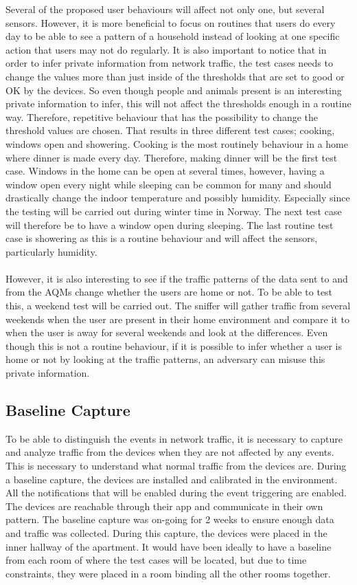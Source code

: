 Several of the proposed user behaviours will affect not only one, but several sensors. However, it is more beneficial to focus on routines that users do every day to be able to see a pattern of a household instead of looking at one specific action that users may not do regularly. It is also important to notice that in order to infer private information from network traffic, the test cases needs to change the values more than just inside of the thresholds that are set to good or OK by the devices. So even though people and animals present is an interesting private information to infer, this will not affect the thresholds enough in a routine way. Therefore, repetitive behaviour that has the possibility to change the threshold values are chosen. That results in three different test cases; cooking, windows open and showering. Cooking is the most routinely behaviour in a home where dinner is made every day. Therefore, making dinner will be the first test case. Windows in the home can be open at several times, however, having a window open every night while sleeping can be common for many and should drastically change the indoor temperature and possibly humidity. Especially since the testing will be carried out during winter time in Norway. The next test case will therefore be to have a window open during sleeping. The last routine test case is showering as this is a routine behaviour and will affect the sensors, particularly humidity. 
\\\\
However, it is also interesting to see if the traffic patterns of the data sent to and from the AQMs change whether the users are home or not. To be able to test this, a weekend test will be carried out. The sniffer will gather traffic from several weekends when the user are present in their home environment and compare it to when the user is away for several weekends and look at the differences. Even though this is not a routine behaviour, if it is possible to infer whether a user is home or not by looking at the traffic patterns, an adversary can misuse this private information. 

\subsection{Baseline Capture}
To be able to distinguish the events in network traffic, it is necessary to capture and analyze traffic from the devices when they are not affected by any events. This is necessary to understand what normal traffic from the devices are. During a baseline capture, the devices are installed and calibrated in the environment. All the notifications that will be enabled during the event triggering are enabled. The devices are reachable through their app and communicate in their own pattern. The baseline capture was on-going for 2 weeks to ensure enough data and traffic was collected. During this capture, the devices were placed in the inner hallway of the apartment. It would have been ideally to have a baseline from each room of where the test cases will be located, but due to time constraints, they were placed in a room binding all the other rooms together. 

